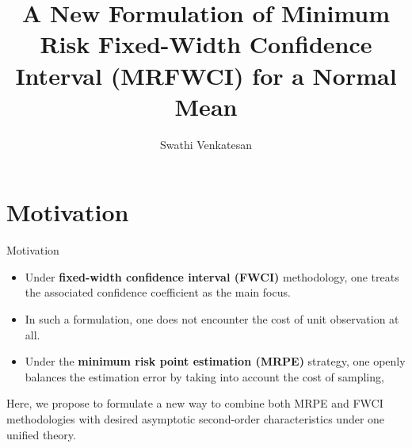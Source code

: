 \documentclass [xcolor=svgnames, t] {beamer}
\title[]{A New Formulation of Minimum Risk Fixed-Width Confidence
Interval (MRFWCI) for a Normal Mean}
\institute[]{Department of Statistics \\ University of Connecticut}
\author[]{ Swathi Venkatesan }
\date{}
\begin{document}
\begin{frame}
\maketitle
\end{frame}






\section{Motivation}
\begin{frame}{Motivation}

\begin{itemize}
\item Under\textbf{ fixed-width confidence interval (FWCI)} methodology, one treats the associated confidence coefficient as the main focus.
\item  In such a formulation, one does not encounter the cost of unit observation at all.
\item  Under the \textbf{minimum risk point estimation (MRPE)} strategy, one openly balances the estimation
error by taking into account the cost of sampling,
\end{itemize}

Here, we propose to formulate a new way to combine both MRPE and FWCI methodologies
with desired asymptotic second-order characteristics under one unified theory.

\end{frame}

\end{document}
